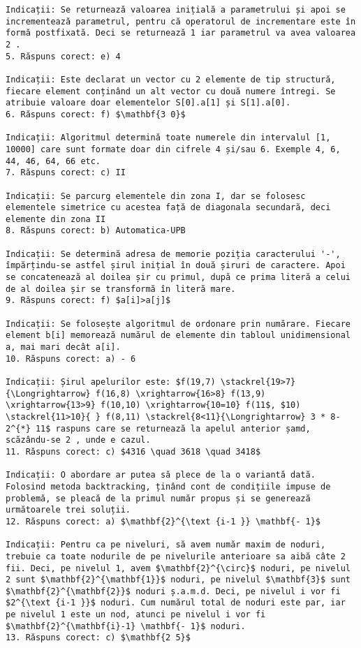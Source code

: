\begin{verbatim}
Indicații: Se returnează valoarea inițială a parametrului și apoi se incrementează parametrul, pentru că operatorul de incrementare este în formă postfixată. Deci se returnează 1 iar parametrul va avea valoarea 2 .
5. Răspuns corect: e) 4

Indicații: Este declarat un vector cu 2 elemente de tip structură, fiecare element conținând un alt vector cu două numere întregi. Se atribuie valoare doar elementelor S[0].a[1] și S[1].a[0].
6. Răspuns corect: f) $\mathbf{3 0}$

Indicații: Algoritmul determină toate numerele din intervalul [1, 10000] care sunt formate doar din cifrele 4 și/sau 6. Exemple 4, 6, 44, 46, 64, 66 etc.
7. Răspuns corect: c) II

Indicații: Se parcurg elementele din zona I, dar se folosesc elementele simetrice cu acestea față de diagonala secundară, deci elemente din zona II
8. Răspuns corect: b) Automatica-UPB

Indicații: Se determină adresa de memorie poziția caracterului '-', împărțindu-se astfel șirul inițial în două șiruri de caractere. Apoi se concatenează al doilea șir cu primul, după ce prima literă a celui de al doilea șir se transformă în literă mare.
9. Răspuns corect: f) $a[i]>a[j]$

Indicații: Se folosește algoritmul de ordonare prin numărare. Fiecare element b[i] memorează numărul de elemente din tabloul unidimensional a, mai mari decât a[i].
10. Răspuns corect: a) - 6

Indicații: Șirul apelurilor este: $f(19,7) \stackrel{19>7}{\Longrightarrow} f(16,8) \xrightarrow{16>8} f(13,9) \xrightarrow{13>9} f(10,10) \xrightarrow{10=10} f(11$, $10) \stackrel{11>10}{ } f(8,11) \stackrel{8<11}{\Longrightarrow} 3 * 8-2^{*} 11$ raspuns care se returnează la apelul anterior șamd, scăzându-se 2 , unde e cazul.
11. Răspuns corect: c) $4316 \quad 3618 \quad 3418$

Indicații: O abordare ar putea să plece de la o variantă dată. Folosind metoda backtracking, ținând cont de condițiile impuse de problemă, se pleacă de la primul număr propus și se generează următoarele trei soluții.
12. Răspuns corect: a) $\mathbf{2}^{\text {i-1 }} \mathbf{- 1}$

Indicații: Pentru ca pe niveluri, să avem număr maxim de noduri, trebuie ca toate nodurile de pe nivelurile anterioare sa aibă câte 2 fii. Deci, pe nivelul 1, avem $\mathbf{2}^{\circ}$ noduri, pe nivelul 2 sunt $\mathbf{2}^{\mathbf{1}}$ noduri, pe nivelul $\mathbf{3}$ sunt $\mathbf{2}^{\mathbf{2}}$ noduri ș.a.m.d. Deci, pe nivelul i vor fi $2^{\text {i-1 }}$ noduri. Cum numărul total de noduri este par, iar pe nivelul 1 este un nod, atunci pe nivelul i vor fi $\mathbf{2}^{\mathbf{i}-1} \mathbf{- 1}$ noduri.
13. Răspuns corect: c) $\mathbf{2 5}$


\end{verbatim}
